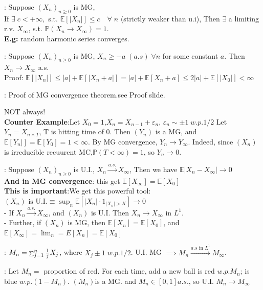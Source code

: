 \documentclass[a4paper, landscape]{article}
\newcommand{\subtopic}[1]{\par\textbf{#1}}
\newcommand{\smallsum}{\mathop{\scalebox{0.65}{$\sum$}}\nolimits}
\renewcommand{\subtopic}[1]{\par\textbf{\color{blue}{#1}}} %
\begin{document}
\begin{multicols}{4}
 \subtopic{Theorem: MG Convergence}: Suppose $(X_n)_{n\geqslant0}$ is MG,\\
 If $\exists \;c<+\infty,$ s.t. $\mathbb E[|X_n|]\leqslant c\quad \forall\;n$ (strictly weaker than u.i), Then $\exists$ a limiting r.v. $X_\infty$, s.t. $\mathbb P(X_n\to X_\infty)=1$.\vspace{0.5em}\\
 \textbf{E.g:} random harmonic series converges.\\
 \subtopic{Corollary}: Suppose $(X_n)_{n\geqslant0}$ is MG, $X_n\geqslant-a\;(a.s)\;\forall n$ for some constant $a$. Then $X_n \to X_\infty$ a.s.\vspace{0.5em}\\
 Proof: $\mathbb E[|X_n|]\leqslant|a|+\mathbb E[|X_n+a|]=|a|+\mathbb E[X_n+a]\leqslant2|a|+\mathbb E[|X_0|]<\infty$
 \subtopic{Upcrossing Theorem}: Proof of MG convergence theorem.see Proof slide.
 \subtopic{Is $\mathbb E[X_\infty]=\mathbb E[X_0]$?} NOT always!\\
 \textbf{Counter Example}:Let $X_0=1$,$X_n=X_{n-1}+\varepsilon_n$, $\varepsilon_n\sim\pm1\;w.p.1/2$ Let $Y_n=X_{n \land T}$, T is hitting time  of 0. Then $(Y_n)$ is a MG, and $\mathbb E[Y_n|]=\mathbb E[Y_0]=1<\infty$. By MG convergence, $Y_n\to Y_\infty$. Indeed, since $(X_n)$ is irreducible recuurent MC,$\mathbb P(T<\infty)=1$, so $Y_n\to 0$.
 \subtopic{Theorem: Uniform Convergence}: Suppose $(X_n)_{n\geqslant0}$ is U.I., $X_n \overset{a.s.}{\to} X_\infty$, Then we have $\mathbb E|X_n-X_\infty|\to0$\\
 \textbf{And in MG convergence}: this get $\mathbb E[X_\infty]=\mathbb E[X_0]$\vspace{0.5em}\\
 \textbf{This is important}:We get this powerful tool:\\
 $(X_n) \text{ is U.I.} \equiv \sup_n \mathbb E[|X_n|\cdot1_{|X_n|>K}]\to 0$\\
 - If $X_n\overset{a.s.}{\to} X_\infty$, and $(X_n)$ is U.I. Then $X_n\to X_\infty$ in $L^1$. \\
 - Further, if $(X_n)$ is MG, then $\mathbb E[X_n]=\mathbb E[X_0]$, and $\mathbb E[X_\infty]=\lim_n\mathbb= E[X_n]=\mathbb E[X_0]$\\
 \subtopic{Random Harmonic Series}: $M_n=\smallsum_{j=1}^{n}\frac1jX_j$, where $X_j\pm1\;w.p.1/2$. U.I. MG $\implies M_n\overset{a.s \text{ in }L^1}{\to} M_\infty$.
 \subtopic{Polya's Urn}: Let $M_n=$ proportion of red. For each time, add a new ball is red $w.p. M_n$; is blue $w.p.(1-M_n)$. $(M_n)$is a MG. and $M_n\in[0,1] a.s.$, so U.I. $M_n\to M_\infty$ 

\end{multicols}
\end{document}
